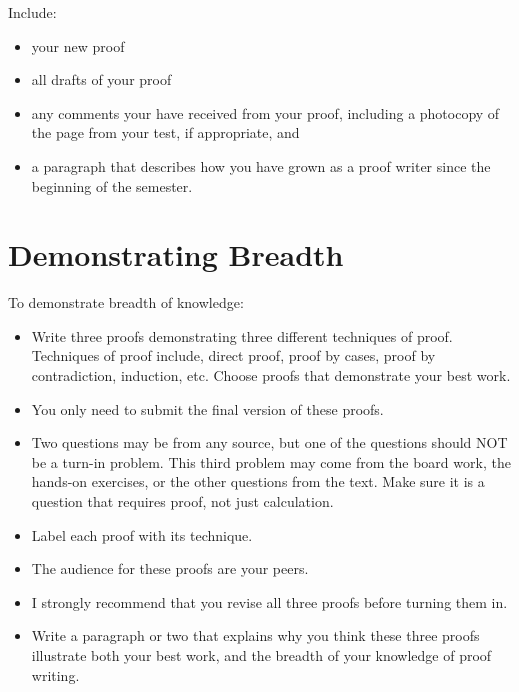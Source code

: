 \documentclass[12pt]{article}
\begin{document}
Include: \begin{itemize}\item your new proof \item all drafts of your proof \item any comments your have received from your proof, including a photocopy of the page from your test, if appropriate, and

\item  a paragraph that describes how you have grown as a proof writer since the beginning of the semester. \end{itemize}



\section{Demonstrating Breadth} 
To demonstrate breadth of knowledge: 
\begin{itemize} \item Write three proofs demonstrating three different techniques of proof. Techniques of proof include, direct proof, proof by cases, proof by contradiction, induction, etc. Choose proofs that demonstrate your best work.

\item You only need to submit the final version of these proofs. 

\item Two questions may be from any source, but one of the questions should NOT be a turn-in problem. This third problem may come from the board work, the hands-on exercises, or the other questions from the text. Make sure it is a question that requires proof, not just calculation.

\item Label each proof with its technique.

\item The audience for these proofs are your peers. 

\item I strongly recommend that you revise all three proofs before turning them in.

\item Write a paragraph or two that explains why you think these three proofs illustrate both your best work, and the breadth of your knowledge of proof writing.

\end{itemize}
\end{document}
